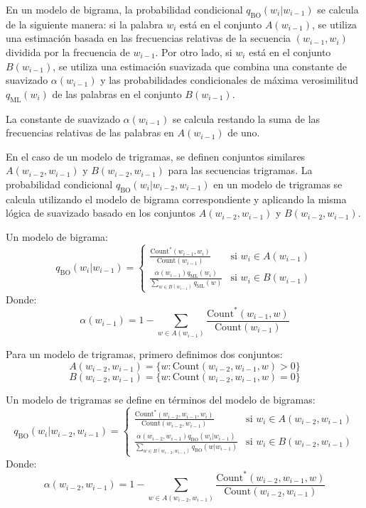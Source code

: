 \documentclass[11pt,fleqn]{book} %
\begin{document}
En un modelo de bigrama, la probabilidad condicional $q_{\text{BO}}(w_i | w_{i-1})$ se calcula de la siguiente manera: si la palabra $w_i$ está en el conjunto $A(w_{i-1})$, se utiliza una estimación basada en las frecuencias relativas de la secuencia $(w_{i-1}, w_i)$ dividida por la frecuencia de $w_{i-1}$. Por otro lado, si $w_i$ está en el conjunto $B(w_{i-1})$, se utiliza una estimación suavizada que combina una constante de suavizado $\alpha(w_{i-1})$ y las probabilidades condicionales de máxima verosimilitud $q_{\text{ML}}(w_i)$ de las palabras en el conjunto $B(w_{i-1})$.

La constante de suavizado $\alpha(w_{i-1})$ se calcula restando la suma de las frecuencias relativas de las palabras en $A(w_{i-1})$ de uno.

En el caso de un modelo de trigramas, se definen conjuntos similares $A(w_{i-2}, w_{i-1})$ y $B(w_{i-2}, w_{i-1})$ para las secuencias trigramas. La probabilidad condicional $q_{\text{BO}}(w_i | w_{i-2}, w_{i-1})$ en un modelo de trigramas se calcula utilizando el modelo de bigrama correspondiente y aplicando la misma lógica de suavizado basado en los conjuntos $A(w_{i-2}, w_{i-1})$ y $B(w_{i-2}, w_{i-1})$.

    
    


Un modelo de bigrama:
    \[
    q_{\text{BO}}(w_i | w_{i-1}) =
    \begin{cases}
        \frac{\text{Count}^*(w_{i-1}, w_i)}{\text{Count}(w_{i-1})} & \text{si } w_i \in A(w_{i-1}) \\
        \frac{\alpha(w_{i-1}) q_{\text{ML}}(w_i)}{\sum_{w \in B(w_{i-1})} q_{\text{ML}}(w)} & \text{si } w_i \in B(w_{i-1})
    \end{cases}
    \]
Donde:
    \[
    \alpha(w_{i-1}) = 1 - \sum_{w \in A(w_{i-1})} \frac{\text{Count}^*(w_{i-1}, w)}{\text{Count}(w_{i-1})}
    \]

Para un modelo de trigramas, primero definimos dos conjuntos:
    \[
    A(w_{i-2}, w_{i-1}) = \{w : \text{Count}(w_{i-2}, w_{i-1}, w) > 0\}
    \]
    \[
    B(w_{i-2}, w_{i-1}) = \{w : \text{Count}(w_{i-2}, w_{i-1}, w) = 0\}
    \]

Un modelo de trigramas se define en términos del modelo de bigramas:
    \[
    q_{\text{BO}}(w_i | w_{i-2}, w_{i-1}) =
    \begin{cases}
        \frac{\text{Count}^*(w_{i-2}, w_{i-1}, w_i)}{\text{Count}(w_{i-2}, w_{i-1})} & \text{si } w_i \in A(w_{i-2}, w_{i-1}) \\
        \frac{\alpha(w_{i-2}, w_{i-1}) q_{\text{BO}}(w_i|w_{i-1})}{\sum_{w \in B(w_{i-2}, w_{i-1})} q_{\text{BO}}(w|w_{i-1})} & \text{si } w_i \in B(w_{i-2}, w_{i-1})
    \end{cases}
    \]
Donde:
    \[
    \alpha(w_{i-2}, w_{i-1}) = 1 - \sum_{w \in A(w_{i-2}, w_{i-1})} \frac{\text{Count}^*(w_{i-2}, w_{i-1}, w)}{\text{Count}(w_{i-2}, w_{i-1})}
    \]
\end{document}
